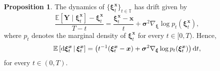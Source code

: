 \documentclass{article}
\def\dd{\mathrm{d}}
\def\xib{\boldsymbol{\xi}}
\theoremstyle{definition}
\newtheorem{proposition}{Proposition}[section]
\begin{document}
\begin{proposition} \label{prop:bridge_drift}
    The dynamics of $\{\boldsymbol{\xi}^{\boldsymbol{x}}_t\}_{t \in \mathbb{T}}$ has drift given by
    \begin{equation*}
       \frac{\mathbb{E}[\boldsymbol{Y} \mid \boldsymbol{\xi}^{\boldsymbol{x}}_t] - \boldsymbol{\xi}^{\boldsymbol{x}}_t}{T-t} = \frac{\boldsymbol{\xi}^{\boldsymbol{x}}_t - \boldsymbol{x}}{t} + \boldsymbol{\sigma}^2 \nabla_{\boldsymbol{\xi}} \log p_t(\boldsymbol{\xi}^{\boldsymbol{x}}_t),
    \end{equation*}
    where $p_t$ denotes the marginal density of $\boldsymbol{\xi}^{\boldsymbol{x}}_t$ for every $t\in[0, T)$. Hence,
		\begin{align}
		\mathbb{E}\left[\dd \boldsymbol{\xi}^{\boldsymbol{x}}_t \,|\, \xib^{\boldsymbol{x}}_{t} \right] = \left(t^{-1}(\boldsymbol{\xi}^{\boldsymbol{x}}_t - \boldsymbol{x})  + \boldsymbol{\sigma}^2 \nabla_{\boldsymbol{\xi}} \log p_t(\boldsymbol{\xi}^{\boldsymbol{x}}_t)\right) \dd t,	 \notag
		\end{align}
		for every $t\in(0, T)$.
\end{proposition}
\end{document}
